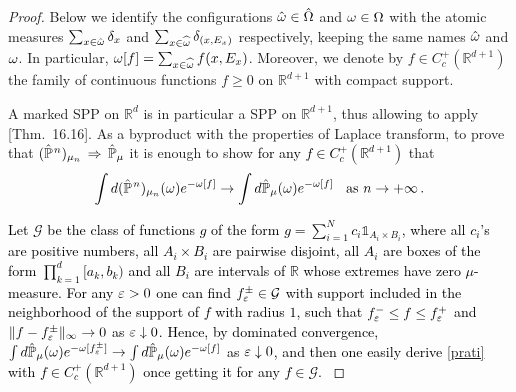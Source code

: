 \documentclass[12pt,a4paper,reqno]{amsart}
\newcommand{\cG}{\ensuremath{\mathcal G}}
\newcommand{\bbP}{{\ensuremath{\mathbb P}} }
\newcommand{\bbR}{{\ensuremath{\mathbb R}} }
\let\O=\Omega \let\P=\Pi   \let\Ps=\Psi \let\Si=\Sigma \let\X=\Xi
\newcommand{\rosso}{\textcolor{black}} %
\newcommand{\da}{\downarrow}
\newcommand{\be}{\begin{equation}}
\newcommand{\en}{\end{equation}}
\newcommand{\pn}{\rosso{{\hat\bbP}^{\hspace{0.03cm}n}}}
\begin{document}
\begin{proof} Below we identify the configurations $\hat\o\in \hat\O$ and $\o\in \O$ with the atomic measures $\sum_{x\in \hat{\omega}} \delta_x$ and $\sum_{x\in \widehat {\omega}} \delta_{(x,E_x)}$ respectively, keeping the same names $\hat{\omega}$ and $ \omega$. In particular, $\omega[f]=\sum_{x\in \widehat{\omega} }f(x,E_x)$. Moreover, we denote by $f\in C^+_c(\bbR^{d+1})$ the family of 
  continuous functions $f\geq 0$ on $\bbR^{d+1}$ with compact support.


 A marked SPP on $\bbR^d$ is in particular a SPP  on $\bbR^{d+1}$, thus allowing to apply \cite{Kal}[Thm.~16.16]. 
 As a byproduct  with the properties of Laplace transform,
  to prove that $(\pn)_{\mu_n} \,\Rightarrow \,  \hat \bbP_\mu$ it is enough to show \rosso{for any $f\in C_c^+(\bbR^{d+1})$} that 
 \be\label{prati} \int d(\pn)_{\mu_n} (\o) e^{- \o [f]} \to  \int d\hat \bbP _{\mu} (\o) e^{- \o [f]}  \;\; \text{ as }n\to+\infty\,.
 \en
 
 
  
 \rosso{Let 
$\cG$ be the class of functions  
$g$ of the 
 form $g=\sum_{i=1}^N c_i \mathds{1}_{A_i \times B_i}$, where all  $c_i$'s are positive  numbers, 
 all $A_i\times B_i$ are pairwise disjoint, 
  all $A_i $  are boxes of the form $\prod_{k=1}^d [a_k,b_k)$ and all $B_i$ are intervals of $\bbR$ whose extremes have zero $\mu$-measure. For any $\varepsilon>0$ one can find $f^{\pm }_\e\in \cG$  with support included in the neighborhood of the support of $f$ with radius $1$, such that $f^-_\varepsilon\leq f \leq f^+_\varepsilon$ and  $\|f- f^\pm _\varepsilon\|_\infty \to 0$ as $\e\da 0$. 
  Hence, by dominated convergence, $\int d \hat \bbP_{\mu} (\o) e^{- \o [f^\pm_\e]}\to \int d \hat \bbP_{\mu} (\o) e^{- \o [f]}$ as $\e \da 0$, and then one 
  easily derive  \eqref{prati} with    $f\in C_c^+(\bbR^{d+1}) $  once getting it for any
  $f\in \cG$.
 }
 
  
 

\end{proof}
\end{document}

